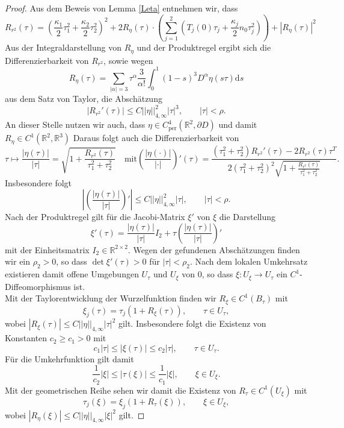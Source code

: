 \documentclass[12pt,a4paper]{scrartcl}
\newcommand{\dd}{\mathrm{d}}
\numberwithin{equation}{section}
\newcommand{\R}{\mathbb{R}} %
\newcommand{\per}{\operatorname{per}}
\begin{document}
\begin{proof}
Aus dem Beweis von Lemma \ref{Leta} entnehmen wir, dass
\[
R_{r^2}(\tau) =\left( \frac{\kappa_1}{2}\tau_1^2 +\frac{\kappa_2}{2} \tau_2^2\right)^2 + 2 R_{\eta}(\tau) \cdot \left( \sum_{j=1}^2 \left(T_j(0)\tau_j+\frac{\kappa_j}{2}n_0 \tau_j^2 \right) \right) + |R_{\eta}(\tau)|^2
\]
Aus der Integraldarstellung von $R_\eta$ und der Produktregel ergibt sich die Differenzierbarkeit von $R_{r^2}$, sowie wegen 
\[
R_{\eta}(\tau)= \sum_{|\alpha|=3} \tau^\alpha\frac{3}{\alpha!}\int_0^1 (1-s)^3 D^\alpha \eta(s\tau) \dd s 
\] aus dem Satz von Taylor, die Abschätzung
\[
|R_{r^2}'(\tau)| \leq C ||\eta||^2_{4,\infty} |\tau|^3, \qquad |\tau| < \rho.
\]
An dieser Stelle nutzen wir auch, dass $\eta \in  C_{\per}^4 (\R^2, \partial D)$ und damit $R_{\eta} \in C^1(\R^2,\R^3)$
Daraus folgt auch die Differenzierbarkeit von \[
\tau \mapsto \frac{|\eta(\tau)|}{|\tau|}= \sqrt{1+\frac{R_{r^2}(\tau)}{\tau_1^2+\tau_2^2}} \quad \mathrm{ mit }\left( \frac{|\eta(\cdot)|}{|\cdot|}\right)'(\tau) = \frac{(\tau_1^2 +\tau_2^2)R_{r^2}'(\tau)-2R_{r^2}(\tau)\tau^T}{2(\tau_1^2 + \tau_2^2)^2 \sqrt{1+\frac{R_{r^2}(\tau)}{\tau_1^2+\tau_2^2}}}.
\]
Insbesondere folgt
\[
\left| \left( \frac{|\eta(\tau)|}{|\tau|}\right) ' \right| \leq C || \eta||_{4,\infty}^2 |\tau|, \qquad |\tau| < \rho.
\]
Nach der Produktregel gilt für die Jacobi-Matrix $\xi'$ von $\xi$ die Darstellung
\[
\xi'(\tau) = \frac{|\eta(\tau)|}{|\tau|}I_2 + \tau \left( \frac{|\eta(\tau)|}{|\tau|}\right) '
\]
mit der Einheitsmatrix $I_2 \in \R^{2 \times 2}$. Wegen der gefundenen Abschätzungen finden wir ein $\rho_2>0$, so dass $\det \xi'(\tau)>0$ für $|\tau| < \rho_2$. Nach dem lokalen Umkehrsatz existieren damit offene Umgebungen $U_{\tau}$ und $U_{\xi}$ von $0$, so dass $\xi : U_{\xi} \to U_{\tau}$ ein $C^1$-Diffeomorphismus ist. \\
Mit der Taylorentwicklung der Wurzelfunktion finden wir $R_\xi \in C^1(B_\tau)$ mit 
\[
\xi_j(\tau) = \tau_j (1+ R_\xi(\tau)), \qquad \tau \in U_{\tau},
\]
wobei $|R_\xi(\tau)| \leq C ||\eta||_{4,\infty} |\tau|^2$ gilt. Insbesondere folgt die Existenz von Konstanten $c_2 \geq c_1 >0$ mit
\[
c_1 |\tau| \leq |\xi(\tau)| \leq c_2 |\tau|, \qquad \tau \in U_{\tau}.
\] 
Für die Umkehrfunktion gilt damit
\[
\frac{1}{c_2}|\xi| \leq | \tau(\xi)| \leq \frac{1}{c_1}|\xi|, \qquad \xi \in U_{\xi}. 
\]
Mit der geometrischen Reihe sehen wir damit die Existenz von $R_\tau \in C^1(U_{\xi})$ mit 
\[
\tau_j(\xi) = \xi_j(1+R_\tau(\xi)), \qquad \xi \in U_{\xi},
\]
wobei $|R_\eta(\xi)| \leq C || \eta||_{4,\infty} |\xi|^2$ gilt.
\end{proof}
\end{document}

